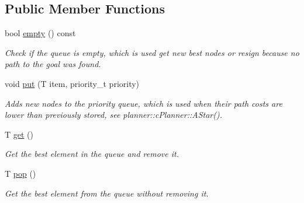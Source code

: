 \subsection*{Public Member Functions}
\begin{DoxyCompactItemize}
\item 
\mbox{\label{structplanner_1_1_priority_queue_a459a18939cb4b02517d5a7db19fd829c}} 
bool \mbox{\hyperlink{structplanner_1_1_priority_queue_a459a18939cb4b02517d5a7db19fd829c}{empty}} () const
\begin{DoxyCompactList}\small\item\em Check if the queue is empty, which is used get new best nodes or resign because no path to the goal was found. \end{DoxyCompactList}\item 
\mbox{\label{structplanner_1_1_priority_queue_afb6cb790e6a592d22a2f05441bfbf23b}} 
void \mbox{\hyperlink{structplanner_1_1_priority_queue_afb6cb790e6a592d22a2f05441bfbf23b}{put}} (T item, priority\+\_\+t priority)
\begin{DoxyCompactList}\small\item\em Adds new nodes to the priority queue, which is used when their path costs are lower than previously stored, see planner\+::c\+Planner\+::\+A\+Star(). \end{DoxyCompactList}\item 
\mbox{\label{structplanner_1_1_priority_queue_abdd3d392da157bb645b5720eace1200a}} 
T \mbox{\hyperlink{structplanner_1_1_priority_queue_abdd3d392da157bb645b5720eace1200a}{get}} ()
\begin{DoxyCompactList}\small\item\em Get the best element in the queue and remove it. \end{DoxyCompactList}\item 
\mbox{\label{structplanner_1_1_priority_queue_abba3d8fcc5729acc424b1fbc38c94e84}} 
T \mbox{\hyperlink{structplanner_1_1_priority_queue_abba3d8fcc5729acc424b1fbc38c94e84}{pop}} ()
\begin{DoxyCompactList}\small\item\em Get the best element from the queue without removing it. \end{DoxyCompactList}\end{DoxyCompactItemize}
